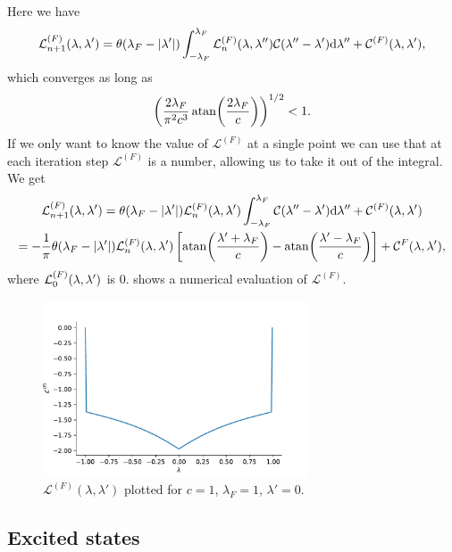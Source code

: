 \documentclass[11pt, a4paper]{report} %
\begin{document}
Here we have 
\begin{equation}
  \mathcal{L}^{(F)}_{n+1} \qty(\lambda, \lambda') = \theta\qty(\lambda_F - \abs{\lambda'}) \int_{-\lambda_F}^{\lambda_F} \mathcal{L}^{(F)}_n\qty(\lambda, \lambda'') \mathcal{C} \qty(\lambda''-\lambda') \dd \lambda'' + \mathcal{C}^{(F)}\qty(\lambda, \lambda'),
\end{equation}
which converges as long as 
\begin{equation}
{\qty(\frac{2\lambda_F}{\pi^2c^3} \atan(\frac{2\lambda_F}{c}))}^{1/2} < 1.
\end{equation}
If we only want to know the value of $\mathcal{L}^{(F)}$ at a single point we can use that at each iteration step $\mathcal{L}^{(F)}$ is a number, allowing us to take it out of the integral.
We get
\begin{gather}
  \mathcal{L}^{(F)}_{n+1} \qty(\lambda, \lambda') = \theta\qty(\lambda_F - \abs{\lambda'})  \mathcal{L}^{(F)}_n\qty(\lambda, \lambda') \int_{-\lambda_F}^{\lambda_F} \mathcal{C} \qty(\lambda''-\lambda') \dd \lambda'' + \mathcal{C}^{(F)}\qty(\lambda, \lambda')\\
= - \frac{1}{\pi} \theta\qty(\lambda_F - \abs{\lambda'}) \mathcal{L}^{(F)}_n\qty(\lambda, \lambda') \left[ \atan(\frac{\lambda'+\lambda_F}{c}) - \atan(\frac{\lambda'-\lambda_F}{c})\right] + \mathcal{C}^{F}\qty(\lambda,\lambda'),
\end{gather}
where \(\mathcal{L}^{(F)}_0\qty(\lambda, \lambda')\) is 0. 
 shows a numerical evaluation of \(\mathcal{L}^{(F)}\).
\begin{figure}[tb!]
  \centering
  \includegraphics[width=0.7\textwidth]{lfplot.pdf}
  \caption{\(\mathcal{L}^{(F)}(\lambda,\lambda')\) plotted for \(c=1\), \(\lambda_F = 1\), \(\lambda'=0\).}\label{fig:lfplot}
\end{figure}

\subsection{Excited states}
\end{document}
